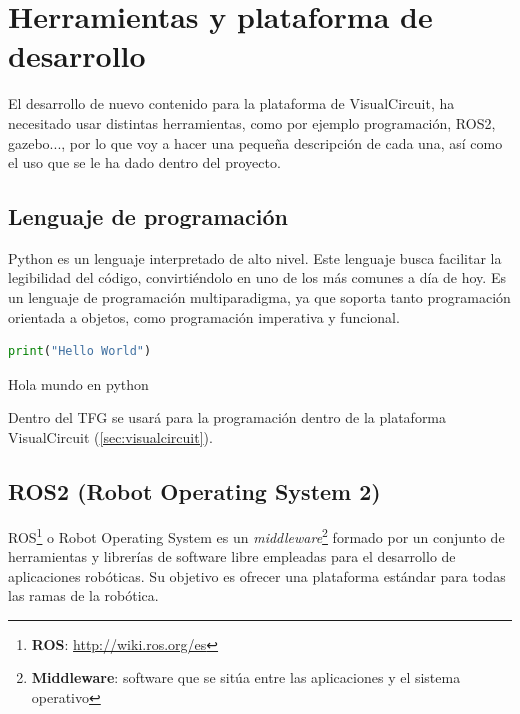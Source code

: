 \chapter{Herramientas y plataforma de desarrollo}
\label{cap:capitulo3}

El desarrollo de nuevo contenido para la plataforma de VisualCircuit, ha necesitado usar distintas herramientas, como por ejemplo programación, ROS2, gazebo..., por lo que voy a hacer una pequeña descripción de cada una, así como el uso que se le ha dado dentro del proyecto.

\section{Lenguaje de programación}
\label{sec:lenguaje_programación}

Python es un lenguaje interpretado de alto nivel. Este lenguaje busca facilitar la legibilidad del código, convirtiéndolo en uno de los más comunes a día de hoy. Es un lenguaje de programación multiparadigma, ya que soporta tanto programación orientada a objetos, como programación imperativa y funcional.\\

\begin{code}[H]
    \begin{lstlisting}[language=python]
    print("Hello World")
    \end{lstlisting}
    \caption[Hola mundo en python]{Hola mundo en python}
    \label{cod:holamundo_python}
\end{code}

Dentro del TFG se usará para la programación dentro de la plataforma VisualCircuit (\ref{sec:visualcircuit}).

\section{ROS2 (Robot Operating System 2)}
\label{sec:ros2}

ROS\footnote{\textbf{ROS}: \url{http://wiki.ros.org/es}} o Robot Operating System es un \textit{middleware}\footnote{{\textbf{Middleware}: software que se sitúa entre las aplicaciones y el sistema operativo}} formado por un conjunto de herramientas y librerías de software libre empleadas para el desarrollo de aplicaciones robóticas. Su objetivo es ofrecer una plataforma estándar para todas las ramas de la robótica.\\

